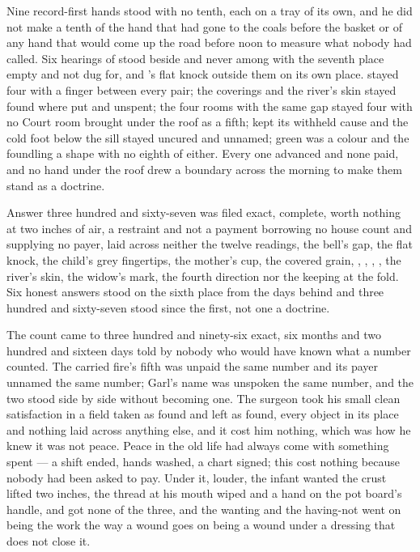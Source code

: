 Nine record-first hands stood with no tenth, each on a tray of its own, and he did not make a tenth of the hand that had gone to the coals before the basket or of any hand that would come up the road before noon to measure what nobody had called. Six hearings of  stood beside and never among with the seventh place empty and not dug for, and 's flat knock outside them on its own place.  stayed four with a finger between every pair; the coverings and the river's skin stayed found where put and unspent; the four rooms with the same gap stayed four with no Court room brought under the roof as a fifth;  kept its withheld cause and the cold foot below the sill stayed uncured and unnamed; green was a colour and the foundling a shape with no eighth of either. Every one advanced and none paid, and no hand under the roof drew a boundary across the morning to make them stand as a doctrine.

Answer three hundred and sixty-seven was filed exact, complete, worth nothing at two inches of air, a restraint and not a payment borrowing no house count and supplying no payer, laid across neither the twelve readings, the bell's gap, the flat knock, the child's grey fingertips, the mother's cup, the covered grain, , , , , the river's skin, the widow's mark, the fourth direction nor the keeping at the fold. Six honest answers stood on the sixth place from the days behind and three hundred and sixty-seven stood since the first, not one a doctrine.

The count came to three hundred and ninety-six exact, six months and two hundred and sixteen days told by nobody who would have known what a number counted. The carried fire's fifth was unpaid the same number and its payer unnamed the same number; Garl's name was unspoken the same number, and the two stood side by side without becoming one. The surgeon took his small clean satisfaction in a field taken as found and left as found, every object in its place and nothing laid across anything else, and it cost him nothing, which was how he knew it was not peace. Peace in the old life had always come with something spent --- a shift ended, hands washed, a chart signed; this cost nothing because nobody had been asked to pay. Under it, louder, the infant wanted the crust lifted two inches, the thread at his mouth wiped and a hand on the pot board's handle, and got none of the three, and the wanting and the having-not went on being the work the way a wound goes on being a wound under a dressing that does not close it.

